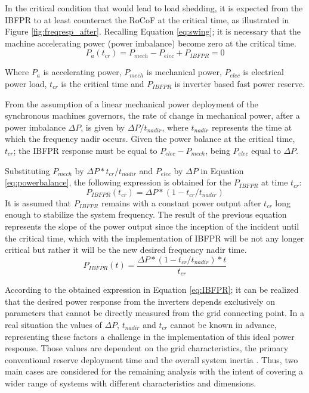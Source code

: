 In the critical condition that would lead to load shedding, it is expected from the IBFPR to at least counteract the RoCoF at the critical time, as illustrated in Figure \ref{fig:freqresp_after}.
Recalling Equation \eqref{eq:swing}; it is necessary that the machine accelerating power (power imbalance) become zero at the critical time.
\begin{equation}
\label{eq:powerbalance}
P_a (t_{cr} )=P_{mech}-P_{elec}+P_{IBFPR}=0
\end{equation}

Where $ P_a $ is accelerating power, $ P_{mech} $ is mechanical power, $ P_{elec} $ is electrical power load, $ t_{cr} $ is the critical time and $ P_{IBFPR} $ is inverter based fast power reserve.

From the assumption of a linear mechanical power deployment of the synchronous machines governors, the rate of change in mechanical power, after a power imbalance $ \Delta P $, is given by $ \Delta P/t_{nadir} $, where $ t_{nadir} $ represents the time at which the frequency nadir occurs. Given the power balance at the critical time, $ t_{cr} $; the IBFPR response must be equal to $ P_{elec}-P_{mech} $, being $ P_{elec} $ equal to $ \Delta P $.


Substituting $ P_{mech} $ by $ \Delta P* t_{cr} /t_{nadir} $ and $ P_{elec} $ by $ \Delta P $ in Equation \eqref{eq:powerbalance}, the following expression is obtained for the $ P_{IBFPR} $ at time $ t_{cr} $:
\begin{equation}
\label{eq:p_at_tcr}
P_{IBFPR} (t_{cr} )=\Delta P*(1-t_{cr}/t_{nadir} )
\end{equation}
It is assumed that $ P_{IBFPR} $ remains with a constant power output after $ t_{cr} $ long enough to stabilize the system frequency. The result of the previous equation represents the slope of the power output since the inception of the incident until the critical time, which with the implementation of IBFPR will be not any longer critical but rather it will be the new desired frequency nadir time.
\begin{equation}
\label{eq:IBFPR}
P_{IBFPR} (t)=\dfrac{\Delta P*(1-t_{cr}/t_{nadir} )*t}{t_{cr}}
\end{equation}

According to the obtained expression in Equation \eqref{eq:IBFPR}; it can be realized that the desired power response from the inverters depends exclusively on parameters that cannot be directly measured from the grid connecting point. In a real situation the values of $\Delta P$, $ t_{nadir} $ and $ t_{cr} $ cannot be known in advance, representing these factors a challenge in the implementation of this ideal power response. Those values are dependent on the grid characteristics, the primary conventional reserve deployment time and the overall system inertia \cite{orum2015future}. Thus, two main cases are considered for the remaining analysis with the intent of covering a wider range of systems with different characteristics and dimensions.

